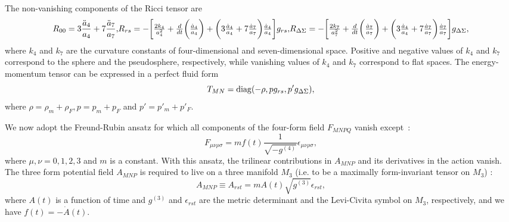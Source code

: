 \documentclass[a4paper,12pt]{article}
\begin{document}
The non-vanishing components of
the Ricci tensor are
\begin{equation}
\label{Ricci}
R_{00}=3\frac{{\ddot a_4}}{a_4}+7\frac{{\ddot a_7}}{a_7},
$$ $$
R_{rs}=-\biggl[\frac{2k_4}{a_4^2}
+\frac{d}{dt}\biggl(\frac{{\dot a}_4}{a_4}\biggr)+\biggl(3\frac{{\dot
a}_4}{a_4}+7\frac{{\dot a}_7}{a_7}\biggr)\frac{{\dot
a}_4}{a_4}\biggr]g_{rs},
$$ $$
R_{\Delta\Sigma}=-\biggl[\frac{2k_7}{a^2_7}+\frac{d}{dt}\biggl(\frac{{\dot
a}_7}{a_7}\biggr)+\biggl(3\frac{{\dot a}_4}{a_4}+7\frac{{\dot
a}_7}{a_7}\biggr)\frac{{\dot a}_7}{a_7}\biggr]g_{\Delta\Sigma},
\end{equation}
where $k_4$ and $k_7$ are the curvature constants of
four-dimensional and seven-dimensional space. Positive and negative values
of $k_4$ and $k_7$ correspond to the sphere and the pseudosphere,
respectively, while vanishing values of $k_4$ and $k_7$ correspond to flat
spaces. The energy-momentum tensor can be expressed in a perfect
fluid form
\begin{equation}
T_{MN}={\rm diag}(-\rho, pg_{rs}, p'g_{\Delta\Sigma}),
\end{equation}
where $\rho=\rho_m+\rho_F, p=p_m+p_F$ and $p'=p'_m+p'_F$.

We now adopt the Freund-Rubin ansatz for which all components of the
four-form field $F_{MNPQ}$ vanish except~\cite{Freund,Freund2}:
\begin{equation}
F_{\mu\nu\rho\sigma}=mf(t)\frac{1}{\sqrt{-g^{(4)}}}\epsilon_{\mu\nu\rho\sigma},
\end{equation}
where $\mu,\nu=0,1,2,3$ and $m$ is a constant.
With this ansatz, the trilinear contributions in $A_{MNP}$ and
its derivatives in the action vanish. The three form potential
field $A_{MNP}$ is required to live on a three manifold $M_3$
(i.e. to be a maximally form-invariant tensor on $M_3$) :
\begin{equation}
A_{MNP}\equiv A_{rst}=mA(t)\sqrt{g^{(3)}}\epsilon_{rst},
\end{equation}
where $A(t)$ is a function of time and $g^{(3)}$ and
$\epsilon_{rst}$ are the metric determinant and the Levi-Civita
symbol on $M_3$, respectively, and we have $f(t)=-{\dot A}(t)$.
\end{document}
